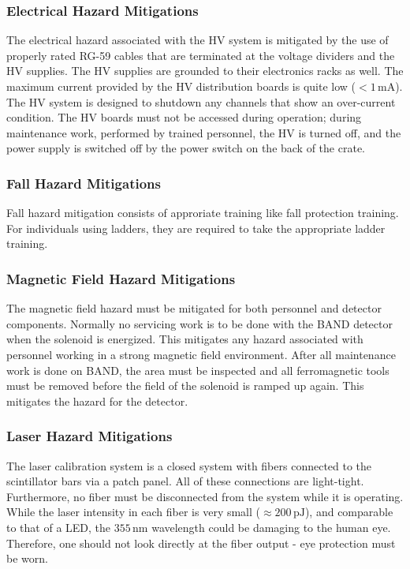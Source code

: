 \indent
\subsubsection{Electrical Hazard Mitigations} 

The electrical hazard associated with the HV system is mitigated by the use of properly rated RG-59 cables
that are terminated at the voltage dividers and the HV supplies.
The HV supplies are grounded to their electronics racks as well. 
The maximum current provided by the HV distribution boards is quite low ($<1\,\mathrm{mA}$). The HV system
is designed to shutdown any channels that show an over-current condition. The HV boards must not be accessed
during operation; during maintenance work, performed by trained personnel, the HV is turned off, and the
power supply is switched off by the power switch on the back of the crate.

\subsubsection{Fall Hazard Mitigations} 

Fall hazard mitigation consists of approriate training like fall protection training. For individuals using
ladders, they are required to take the appropriate ladder training.

\subsubsection{Magnetic Field Hazard Mitigations}

The magnetic field hazard must be mitigated for both personnel and detector components. Normally no servicing
work is to be done with the BAND detector when the solenoid is energized.
This mitigates any hazard associated with personnel working in a strong magnetic field environment. 
After all maintenance work is done on BAND, the area must be inspected and all ferromagnetic tools must be
removed before the field of the solenoid is ramped up again. This mitigates the hazard for the detector. 

\subsubsection{Laser Hazard Mitigations}

The laser calibration system is a closed system with fibers connected to the scintillator bars via a patch
panel. All of these connections are light-tight. Furthermore, no fiber must be disconnected from the system
while it is operating. While the laser intensity in each fiber is very small ($\approx 200\,\mathrm{pJ}$),
and comparable to that of a LED, the $355\,\mathrm{nm}$ wavelength could be damaging to the human eye.
Therefore, one should not look directly at the fiber output - eye protection must be worn. 

